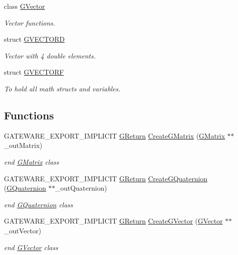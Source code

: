\begin{DoxyCompactItemize}
class \hyperlink{classGW_1_1MATH_1_1GVector}{G\+Vector}
\begin{DoxyCompactList}\small\item\em Vector functions. \end{DoxyCompactList}\item 
struct \hyperlink{structGW_1_1MATH_1_1GVECTORD}{G\+V\+E\+C\+T\+O\+RD}
\begin{DoxyCompactList}\small\item\em Vector with 4 double elements. \end{DoxyCompactList}\item 
struct \hyperlink{structGW_1_1MATH_1_1GVECTORF}{G\+V\+E\+C\+T\+O\+RF}
\begin{DoxyCompactList}\small\item\em To hold all math structs and variables. \end{DoxyCompactList}\end{DoxyCompactItemize}
\subsection*{Functions}
\begin{DoxyCompactItemize}
\item 
G\+A\+T\+E\+W\+A\+R\+E\+\_\+\+E\+X\+P\+O\+R\+T\+\_\+\+I\+M\+P\+L\+I\+C\+IT \hyperlink{namespaceGW_a67a839e3df7ea8a5c5686613a7a3de21}{G\+Return} \hyperlink{namespaceGW_1_1MATH_a32e9bb10a0b5fc1b730822ee510d6ce1}{Create\+G\+Matrix} (\hyperlink{classGW_1_1MATH_1_1GMatrix}{G\+Matrix} $\ast$$\ast$\+\_\+out\+Matrix)
\begin{DoxyCompactList}\small\item\em end \hyperlink{classGW_1_1MATH_1_1GMatrix}{G\+Matrix} class \end{DoxyCompactList}\item 
G\+A\+T\+E\+W\+A\+R\+E\+\_\+\+E\+X\+P\+O\+R\+T\+\_\+\+I\+M\+P\+L\+I\+C\+IT \hyperlink{namespaceGW_a67a839e3df7ea8a5c5686613a7a3de21}{G\+Return} \hyperlink{namespaceGW_1_1MATH_a1cb97726e251c442ce358c884f3498a0}{Create\+G\+Quaternion} (\hyperlink{classGW_1_1MATH_1_1GQuaternion}{G\+Quaternion} $\ast$$\ast$\+\_\+out\+Quaternion)
\begin{DoxyCompactList}\small\item\em end \hyperlink{classGW_1_1MATH_1_1GQuaternion}{G\+Quaternion} class \end{DoxyCompactList}\item 
G\+A\+T\+E\+W\+A\+R\+E\+\_\+\+E\+X\+P\+O\+R\+T\+\_\+\+I\+M\+P\+L\+I\+C\+IT \hyperlink{namespaceGW_a67a839e3df7ea8a5c5686613a7a3de21}{G\+Return} \hyperlink{namespaceGW_1_1MATH_a32dfb827d42ce2d17ed6b4b0e70e4215}{Create\+G\+Vector} (\hyperlink{classGW_1_1MATH_1_1GVector}{G\+Vector} $\ast$$\ast$\+\_\+out\+Vector)
\begin{DoxyCompactList}\small\item\em end \hyperlink{classGW_1_1MATH_1_1GVector}{G\+Vector} class \end{DoxyCompactList}\end{DoxyCompactItemize}


